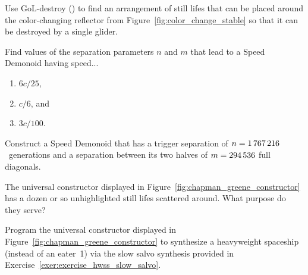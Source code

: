 \begin{multicols}{2}
	
	\mfilbreak
	
	
	\begin{problem}\label{exer:use_gol_destroy} 
		Use GoL-destroy () to find an arrangement of still lifes that can be placed around the color-changing reflector from Figure~\ref{fig:color_change_stable} so that it can be destroyed by a single glider.
	\end{problem}
	
	
	\mfilbreak
	
	
	\begin{problem}\label{exer:speed_demonoid_parameters} 
		Find values of the separation parameters $n$ and $m$ that lead to a Speed Demonoid having speed...\smallskip
		
		\begin{enumerate}[label=\bf\color{ocre}(\alph*)]
			\item $6c/25$,
			
			\item $c/6$, and
			
			\item $3c/100$.
		\end{enumerate}
	\end{problem}
	
	
	\mfilbreak
	
	
	\begin{problem}\label{exer:3c14_speed_demonoid} 
		Construct a Speed Demonoid that has a trigger separation of $n = 1{\,}767{\,}216$~generations and a separation between its two halves of $m = 294{\,}536$ full diagonals.
		
	\end{problem}
	
	
	\mfilbreak
	
	
	\begin{problem}\label{exer:chapman_constructor_why_unhighlighted} 
		The universal constructor displayed in Figure~\ref{fig:chapman_greene_constructor} has a dozen or so unhighlighted still lifes scattered around. What purpose do they serve?
	\end{problem}
	
	
	\mfilbreak
	
	
	\begin{problem}\label{exer:chapman_constructor_make_hwss} 
		Program the universal constructor displayed in Figure~\ref{fig:chapman_greene_constructor} to synthesize a heavyweight spaceship (instead of an eater~1) via the slow salvo synthesis provided in Exercise~\ref{exer:exercise_hwss_slow_salvo}.
	\end{problem}
	

\end{multicols}
